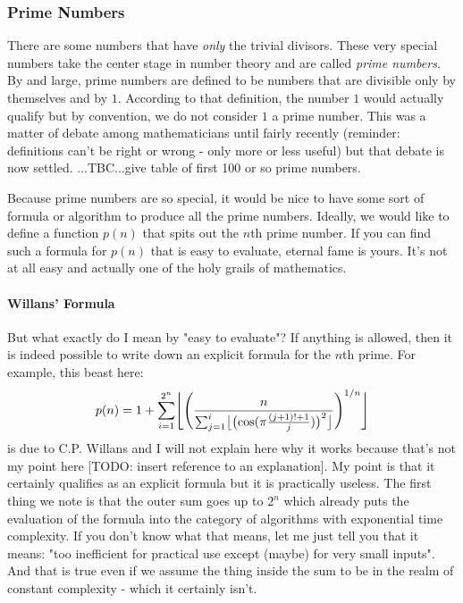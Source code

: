 \subsubsection{Prime Numbers}
There are some numbers that have \emph{only} the trivial divisors. These very special numbers take the center stage in number theory and are called \emph{prime numbers}. By and large, prime numbers are defined to be numbers that are divisible only by themselves and by $1$. According to that definition, the number $1$ would actually qualify but by convention, we do not consider $1$ a prime number. This was a matter of debate among mathematicians until fairly recently (reminder: definitions can't be right or wrong - only more or less useful) but that debate is now settled.
...TBC...give table of first 100 or so prime numbers.

\medskip
Because prime numbers are so special, it would be nice to have some sort of formula or algorithm to produce all the prime numbers. Ideally, we would like to define a function $p(n)$ that spits out the $n$th prime number. If you can find such a formula for $p(n)$ that is easy to evaluate, eternal fame is yours. It's not at all easy and actually one of the holy grails of mathematics.

\paragraph{Willans' Formula}
But what exactly do I mean by "easy to evaluate"? If anything is allowed, then it is indeed possible to write down an explicit formula for the $n$th prime. For example, this beast here:
\begin{equation}
 p(n) = 1 + \sum_{i = 1}^{2^n} 
 \floor[\Bigg]{
 \Biggl(
 \frac{n}{\sum_{j=1}^{i} \floor[\big]{ \bigl( \cos(\pi \frac{(j+1)!+1}{j}) \bigr)^2 } 
  }
 \Biggr)^{1/n}
 }
\end{equation}
is due to C.P. Willans and I will not explain here why it works because that's not my point here [TODO: insert reference to an explanation]. My point is that it certainly qualifies as an explicit formula but it is practically useless. The first thing we note is that the outer sum goes up to $2^n$ which already puts the evaluation of the formula into the category of algorithms with exponential time complexity. If you don't know what that means, let me just tell you that it means: "too inefficient for practical use except (maybe) for very small inputs". And that is true even if we assume the thing inside the sum to be in the realm of constant complexity - which it certainly isn't. 

